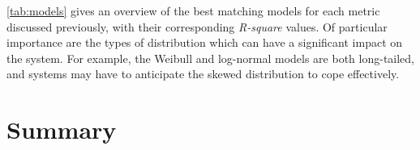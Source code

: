 \autoref{tab:models} gives an overview of the best matching models for each metric discussed previously, with their corresponding \emph{R-square} values. Of particular importance are the types of distribution which can have a significant impact on the system. For example, the Weibull and log-normal models are both long-tailed, and systems may have to anticipate the skewed distribution to cope effectively.

%
%

\section{Summary}

%

